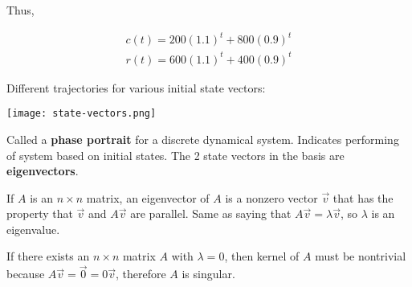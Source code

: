 Thus,

\[\begin{array}{l}
    c(t)=200(1.1)^{t}+800(0.9)^{t} \\
    r(t)=600(1.1)^{t}+400(0.9)^{t}
    \end{array}\]

Different trajectories for various initial state vectors:

\begin{center}
    \texttt{[image: state-vectors.png]}
\end{center}

Called a \textbf{phase portrait} for a discrete dynamical system.
Indicates performing of system based on initial states.
The 2 state vectors in the basis are \textbf{eigenvectors}.

\begin{framed}
    If $A$ is an $n\times n$ matrix, an eigenvector of $A$ is a nonzero vector $\vec{v}$
    that has the property that $\vec{v}$ and $A\vec{v}$ are parallel.
    Same as saying that $A\vec{v}=\lambda\vec{v}$, so $\lambda$ is an eigenvalue.
\end{framed}

If there exists an $n\times n$ matrix $A$ with $\lambda=0$, then kernel of $A$ must be nontrivial
because $A\vec{v}=\vec{0}=0\vec{v}$, therefore $A$ is singular.